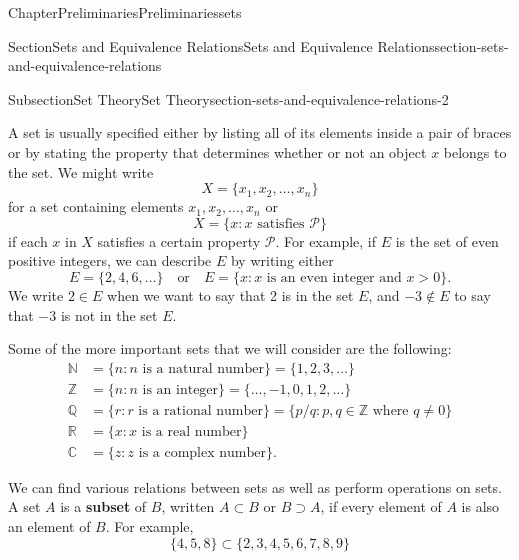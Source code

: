 \documentclass[oneside,10pt,]{book}
\newcommand{\terminology}[1]{\textbf{#1}}
\numberwithin{equation}{section}
\newcommand{\gt}{>}
\begin{document}
\begin{chapterptx}{Chapter}{Preliminaries}{}{Preliminaries}{}{}{sets}
\begin{sectionptx}{Section}{Sets and Equivalence Relations}{}{Sets and Equivalence Relations}{}{}{section-sets-and-equivalence-relations}
\begin{subsectionptx}{Subsection}{Set Theory}{}{Set Theory}{}{}{section-sets-and-equivalence-relations-2}
\par
A set is usually specified either by listing all of its elements inside a pair of braces or by stating the property that determines whether or not an object \(x\) belongs to the set. We might write%
\begin{equation*}
X = \{ x_1, x_2, \ldots, x_n \}
\end{equation*}
for a set containing elements \(x_1, x_2, \ldots, x_n\) or%
\begin{equation*}
X = \{ x :x \text{ satisfies }{\mathcal P}\}
\end{equation*}
if each \(x\) in \(X\) satisfies a certain property \({\mathcal P}\).  For example, if \(E\) is the set of even positive integers, we can describe \(E\) by writing either%
\begin{equation*}
E = \{2, 4, 6, \ldots \} \quad \text{or} \quad E = \{ x : x \text{ is an even integer and } x \gt 0 \}\text{.}
\end{equation*}
We write \(2 \in E\) when we want to say that 2 is in the set \(E\), and \(-3 \notin E\) to say that \(-3\) is not in the set \(E\).%
\par
Some of the more important sets that we will consider are the following:%
\begin{align*}
{\mathbb N} &= \{n: n \text{ is a natural number}\}  = \{1, 2, 3, \ldots \}\\
{\mathbb Z} &= \{n : n \text{ is an integer} \} = \{\ldots, -1, 0, 1,  2, \ldots \}\\
{\mathbb Q} &= \{r : r \text{ is a rational number}\} = \{p/q : p, q \in {\mathbb Z} \text{ where } q \neq 0\}\\
{\mathbb R} &= \{ x : x \text{ is a real number} \}\\
{\mathbb C} &= \{z : z \text{ is a complex number}\}\text{.}
\end{align*}
\label{section-sets-and-equivalence-relations-2-4-2}\label{section-sets-and-equivalence-relations-2-4-3}\label{section-sets-and-equivalence-relations-2-4-4}\label{section-sets-and-equivalence-relations-2-4-5}\label{section-sets-and-equivalence-relations-2-4-6}%
\par
We can find various relations between sets as well as perform operations on sets.  A set \(A\) is a \terminology{subset} of \(B\), written \(A \subset B\) or \(B \supset A\), if every element of \(A\) is also an element of \(B\).  \label{section-sets-and-equivalence-relations-2-5-8} For example,%
\begin{equation*}
\{4,5,8\} \subset \{2, 3, 4, 5, 6, 7, 8, 9 \}

\end{equation*}
\end{subsectionptx}
\end{sectionptx}
\end{chapterptx}
\end{document}
